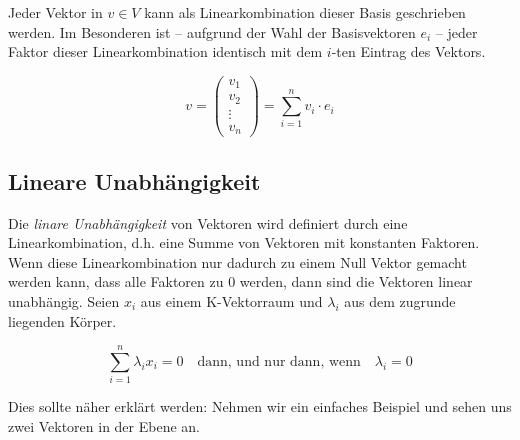 Jeder Vektor in $v\in V$ kann als Linearkombination dieser Basis geschrieben werden. Im Besonderen ist -- aufgrund der Wahl der Basisvektoren $e_i$ -- jeder Faktor dieser Linearkombination identisch mit dem $i$-ten Eintrag des Vektors. 

\[
v = \begin{pmatrix}
v_1 \\
v_2 \\
\vdots \\
v_n
\end{pmatrix} = \sum_{i=1}^{n} v_i \cdot e_i
\]

\subsection{Lineare Unabhängigkeit}

\begin{definition}
Die \textsl{linare Unabhängigkeit}  von Vektoren wird definiert durch eine Linearkombination, d.h. eine Summe von Vektoren mit konstanten Faktoren. Wenn diese Linearkombination nur dadurch zu einem Null Vektor gemacht werden kann, dass alle Faktoren zu 0 werden, dann sind die Vektoren linear unabhängig. Seien $x_i$ aus einem K-Vektorraum und $\lambda_i $ aus dem zugrunde liegenden Körper. 

\begin{equation}\label{eq:linunabh}
\sum_{i=1}^{n} \lambda_i x_i = 0 \quad \text{dann, und nur dann, wenn} \quad \lambda_i = 0
\end{equation}
\end{definition}

Dies sollte näher erklärt werden: Nehmen wir ein einfaches Beispiel und sehen uns zwei Vektoren in der Ebene an. 

\bigskip

\begin{center}
\end{center}

